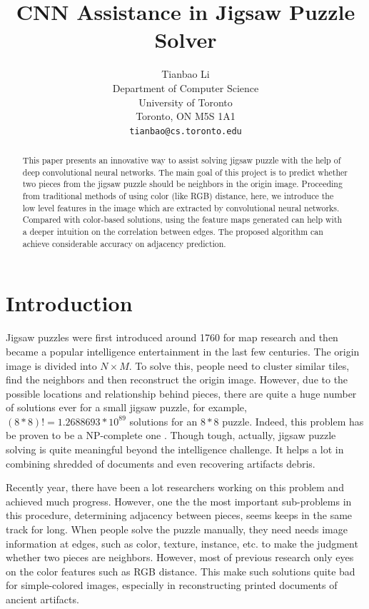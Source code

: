 \documentclass{article}
\title{CNN Assistance in Jigsaw Puzzle Solver}
\author{Tianbao Li\\
  Department of Computer Science\\
  University of Toronto\\
  Toronto, ON M5S 1A1 \\
  \texttt{tianbao@cs.toronto.edu} \\
}
\begin{document}

\maketitle

\begin{abstract}

This paper presents an innovative way to assist solving jigsaw puzzle with the help of deep convolutional neural networks. The main goal of this project is to predict whether two pieces from the jigsaw puzzle should be neighbors in the origin image. Proceeding from traditional methods of using color (like RGB) distance, here, we introduce the low level features in the image which are extracted by convolutional neural networks. Compared with color-based solutions, using the feature maps generated can help with a deeper intuition on the correlation between edges. The proposed algorithm can achieve considerable accuracy on adjacency prediction.

\end{abstract}

\section{Introduction}

Jigsaw puzzles were first introduced around 1760 for map research and then became a popular intelligence entertainment \cite{freeman1964apictorial} in the last few centuries. The origin image is divided into $N\times M$. To solve this, people need to cluster similar tiles, find the neighbors and then reconstruct the origin image. However, due to the possible locations and relationship behind pieces, there are quite a huge number of solutions ever for a small jigsaw puzzle, for example, $(8*8)!=1.2688693*10^{89}$ solutions for an $8*8$ puzzle. Indeed, this problem has be proven to be a NP-complete one \cite{altman1989solving,demaine2007jigsaw}. Though tough, actually, jigsaw puzzle solving is quite meaningful beyond the intelligence challenge. It helps a lot in combining shredded of documents \cite{levin1975computer,marques2009reconstructing} and even recovering artifacts debris\cite{koller2006computer}.

Recently year, there have been a lot researchers working on this problem and achieved much progress. However, one the the most important sub-problems in this procedure, determining adjacency between pieces, seems keeps in the same track for long. When people solve the puzzle manually, they need needs image information at edges, such as color, texture, instance, etc. to make the judgment whether two pieces are neighbors. However, most of previous research only eyes on the color features such as RGB distance. This make such solutions quite bad for simple-colored images, especially in reconstructing printed documents of ancient artifacts.
\end{document}
